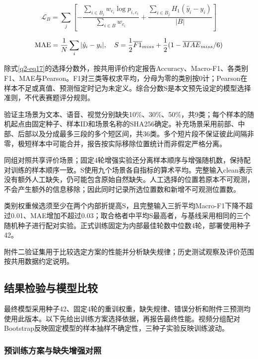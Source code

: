 \begin{equation}
\mathcal L_B=\sum_j\left[-\frac{\sum_{i\in B_j}w_{c_i}\log p_{i,c_i}}{\sum_{i\in B}w_{c_i}}+\frac{\sum_{i\in B_j}H_1(\hat y_i-y_i)}{|B|}\right]\label{q2-eq15}
\end{equation}

\begin{equation}
\operatorname{MAE}={1\over N}\sum_i|\hat y_i-y_i|,\quad S={1\over2}\overline{F1}_{miss}+{1\over2}(1-\overline{MAE}_{miss}/6)\label{q2-eq17}
\end{equation}

除式\eqref{q2-eq17}的选择分数外，按共用评价约定报告Accuracy、Macro-F1、各类别F1、MAE与Pearson。F1对三类等权求平均，分母为零的类别按0计；Pearson在样本不足或真值、预测恒定时记为未定义。综合分数S是本文预先设定的模型选择准则，不代表赛题评分规则。

验证主场景为文本、语音、视觉分别缺失10\%、30\%、50\%，共9类；每个样本的随机起点由固定种子、样本ID和场景名称的SHA256确定。补充场景采用前部、中部、后部以及分成最多三段的多个短区间，共36类。多个短片段不保证彼此间隔非零，极短样本中可能合并，报告按实际移除位置统计而非假定严格分离。

同组对照共享评价场景；固定4轮增强实验还分离样本顺序与增强随机数，保持配对训练的样本顺序一致。S使用九个场景各自指标的算术平均。完整输入clean表示没有额外人工缺失，仍可能包含原始自然缺失。人工选择的位置若原本不可观测，不会产生额外的信息移除；因此同时记录所选位置数和新增不可观测位置数。

类别权重候选须至少在两个内部折提高S，且完整输入三折平均Macro-F1下降不超过0.01、MAE增加不超过0.03；取合格者中平均S最高者，与基线采用相同的三个随机种子进行配对实验。正式训练固定为内部最佳轮数中位数4轮，部署使用种子42。

附件二验证集用于比较选定方案的性能并分析缺失规律；历史测试观察及评价范围按共用数据约定说明。

\hypertarget{q2-ux7ed3ux679cux68c0ux9a8cux4e0eux6a21ux578bux6bd4ux8f83}{%
\subsection{结果检验与模型比较}\label{q2-ux7ed3ux679cux68c0ux9a8cux4e0eux6a21ux578bux6bd4ux8f83}}

最终模型采用种子42、固定4轮的重训权重，缺失规律、错误分析和附件三预测均使用此版本。以下先给出训练方案选择依据，再报告最终性能。视频分组配对Bootstrap反映固定模型的样本抽样不确定性，三种子实验反映训练波动。

\hypertarget{q2-ux9884ux8badux7ec3ux65b9ux6848ux4e0eux7f3aux5931ux589eux5f3aux5bf9ux7167}{%
\subsubsection{预训练方案与缺失增强对照}\label{q2-ux9884ux8badux7ec3ux65b9ux6848ux4e0eux7f3aux5931ux589eux5f3aux5bf9ux7167}}

